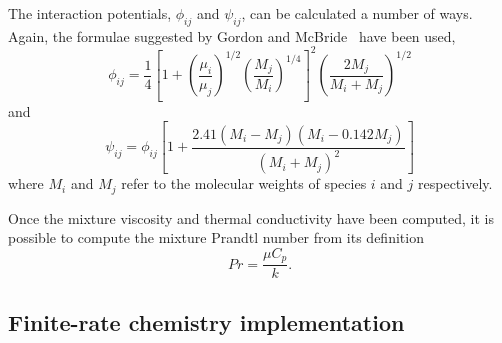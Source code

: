 \medskip
The interaction potentials, $\phi_{ij}$ and $\psi_{ij}$, can be calculated a number of ways.
Again, the formulae suggested by Gordon and McBride~\cite{gordon_mcbride_94} have been used,
\begin{equation}
   \phi_{ij} = \frac{1}{4} \left[ 1 + \left(\frac{\mu_i}{\mu_j}\right)^{1/2} 
               \left(\frac{M_j}{M_i}\right)^{1/4} \right]^2\left(\frac{2M_j}{M_i + M_j}\right)^{1/2}
\end{equation}
and
\begin{equation}
\psi_{ij} = \phi_{ij} \left[ 1 + \frac{2.41(M_i - M_j)(M_i - 0.142M_j)}{(M_i + M_j)^2}\right]
\end{equation}
where $M_i$ and $M_j$ refer to the molecular weights of species $i$ and $j$ respectively.

\medskip
Once the mixture viscosity and thermal conductivity have been computed, it is possible to
compute the mixture Prandtl number from its definition
\begin{equation}
Pr = \frac{\mu C_p}{k}.
\end{equation}

\subsection{Finite-rate chemistry implementation}
\label{sec:chemistry}

